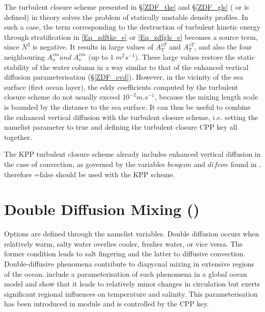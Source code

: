 The turbulent closure scheme presented in \S\ref{ZDF_tke} and \S\ref{ZDF_gls} 
( or  is defined) in theory solves the problem of statically 
unstable density profiles. In such a case, the term corresponding to the 
destruction of turbulent kinetic energy through stratification in \eqref{Eq_zdftke_e} 
or \eqref{Eq_zdfgls_e} becomes a source term, since $N^2$ is negative. 
It results in large values of $A_T^{vT}$ and  $A_T^{vT}$, and also the four neighbouring 
$A_u^{vm} {and}\;A_v^{vm}$ (up to $1\;m^2s^{-1})$. These large values 
restore the static stability of the water column in a way similar to that of the 
enhanced vertical diffusion parameterisation (\S\ref{ZDF_evd}). However, 
in the vicinity of the sea surface (first ocean layer), the eddy coefficients 
computed by the turbulent closure scheme do not usually exceed $10^{-2}m.s^{-1}$, 
because the mixing length scale is bounded by the distance to the sea surface. 
It can thus be useful to combine the enhanced vertical 
diffusion with the turbulent closure scheme, $i.e.$ setting the  
namelist parameter to true and defining the turbulent closure CPP key all together.

The KPP turbulent closure scheme already includes enhanced vertical diffusion 
in the case of convection, as governed by the variables $bvsqcon$ and $difcon$ 
found in , therefore =false should be used with the KPP 
scheme. %

\section  [Double Diffusion Mixing (\key{zdfddm})]
		{Double Diffusion Mixing ()}
\label{ZDF_ddm}


Options are defined through the   namelist variables.
Double diffusion occurs when relatively warm, salty water overlies cooler, fresher 
water, or vice versa. The former condition leads to salt fingering and the latter 
to diffusive convection. Double-diffusive phenomena contribute to diapycnal 
mixing in extensive regions of the ocean.  \citet{Merryfield1999} include a 
parameterisation of such phenomena in a global ocean model and show that 
it leads to relatively minor changes in circulation but exerts significant regional 
influences on temperature and salinity. This parameterisation has been 
introduced in  module and is controlled by the  CPP key.

